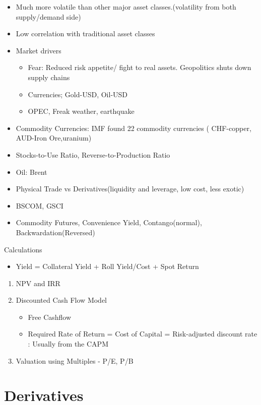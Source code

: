 \documentclass[11pt, openany]{book}              %
\begin{document}
\begin{itemize}
    \item Much more volatile than other major asset classes.(volatility from both supply/demand side)
    \item Low correlation with traditional asset classes
    \item Market drivers
    \begin{itemize}
    	\item Fear: Reduced risk appetite/ fight to real assets. Geopolitics shuts down supply chains
    	\item Currencies; Gold-USD, Oil-USD
    	\item OPEC, Freak weather, earthquake
    \end{itemize}
    \item Commodity Currencies: IMF found 22 commodity currencies ( CHF-copper, AUD-Iron Ore,uranium)
    \item Stocks-to-Use Ratio, Reverse-to-Production Ratio
    \item Oil: Brent
    \item Physical Trade vs Derivatives(liquidity and leverage, low cost, less exotic)
    \item BSCOM, GSCI 
    \item Commodity Futures, Convenience Yield, Contango(normal), Backwardation(Reversed)
\end{itemize}

Calculations
\begin{itemize}
    \item Yield = Collateral Yield + Roll Yield/Cost + Spot Return
\end{itemize}

\begin{enumerate}
 \item NPV and IRR 
 \item Discounted Cash Flow Model
  \begin{itemize}
    \item Free Cashflow
    \item Required Rate of Return = Cost of Capital = Risk-adjusted discount rate : Usually from the CAPM
   \end{itemize}
 \item Valuation using Multiples - P/E, P/B 
 \end{enumerate}

\section{Derivatives}
\end{document}

